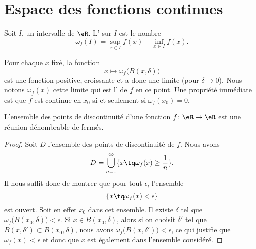 
\section{Espace des fonctions continues}

\begin{definition}
    Soit \( I\), un intervalle de \( \eR\). L' sur \( I\) est le nombre
    \begin{equation}
        \omega_f(I)=\sup_{x\in I}f(x)-\inf_{x\in I}f(x).
    \end{equation}
\end{definition}
    Pour chaque \( x\) fixé, la fonction
    \begin{equation}
        x\mapsto \omega_f\big( B(x,\delta) \big)
    \end{equation}
    est une fonction positive, croissante et a donc une limite (pour \( \delta\to 0\)). Nous notons \( \omega_f(x)\) cette limite qui est l' de \( f\) en ce point. Une propriété immédiate est que \( f\) est continue en \( x_0\) si et seulement si \( \omega_f(x_0)=0\).

    \begin{lemma}       \label{LemuaPbtQ}
    L'ensemble des points de discontinuité d'une fonction \( f\colon \eR\to \eR\) est une réunion dénombrable de fermés.
\end{lemma}

\begin{proof}
    Soit \( D\) l'ensemble des points de discontinuité de \( f\). Nous avons
    \begin{equation}
        D=\bigcup_{n=1}^{\infty}\{ x\tq \omega_f(x)\geq \frac{1}{ n } \}.
    \end{equation}
    Il nous suffit donc de montrer que pour tout \( \epsilon\), l'ensemble
    \begin{equation}
        \{ x\tq \omega_f(x)<\epsilon \}
    \end{equation}
    est ouvert. Soit en effet \( x_0\) dans cet ensemble. Il existe \( \delta\) tel que \( \omega_f\big( B(x_0,\delta) \big)<\epsilon\). Si \( x\in B(x_0,\delta)\), alors si on choisit \( \delta'\) tel que \( B(x,\delta')\subset B(x_0,\delta)\), nous avons \( \omega_f\big( B(x,\delta') \big)<\epsilon\), ce qui justifie que \( \omega_f(x)<\epsilon\) et donc que \( x\) est également dans l'ensemble considéré.
\end{proof}

